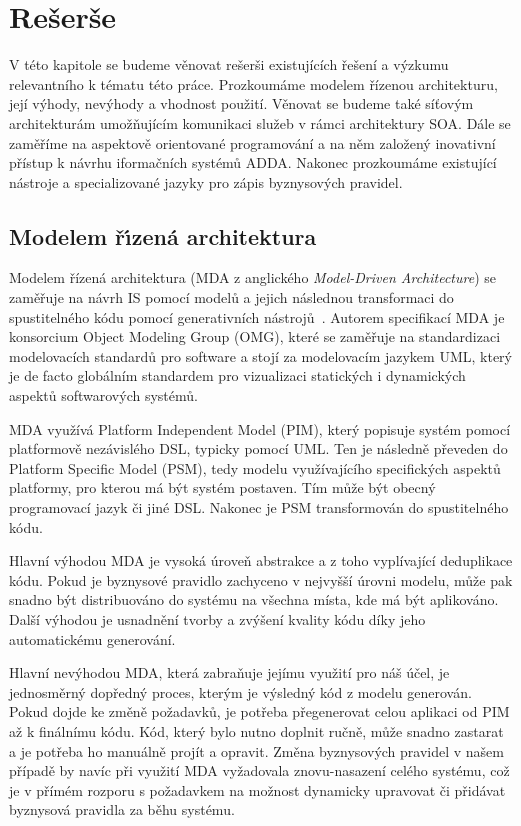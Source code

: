 
\chapter{Rešerše}\label{ch:reserse}

V této kapitole se budeme věnovat rešerši existujících řešení
a výzkumu relevantního k tématu této práce. Prozkoumáme
modelem řízenou architekturu, její výhody, nevýhody a vhodnost
použití. Věnovat se budeme také síťovým architekturám umožňujícím
komunikaci služeb v rámci architektury \gls{SOA}.
Dále se zaměříme na aspektově orientované programování
a na něm založený inovativní přístup k návrhu iformačních systémů \gls{ADDA}.
Nakonec prozkoumáme existující nástroje a specializované jazyky pro zápis
byznysových pravidel.

\section{Modelem ř\'{\i}zená architektura}

Modelem řízená architektura (\gls{MDA} z anglického \textit{Model-Driven
Architecture}) se zaměřuje na návrh \gls{IS} pomocí modelů a jejich
následnou transformaci do spustitelného kódu pomocí generativních nástrojů~\cite{soley2000model}.
Autorem specifikací \gls{MDA} je konsorcium Object Modeling Group (\gls{OMG}),
které se zaměřuje na standardizaci modelovacích standardů pro software
a stojí za modelovacím jazykem \gls{UML}, který je de facto globálním standardem
pro vizualizaci statických i dynamických aspektů softwarových systémů.

\gls{MDA} využívá Platform Independent Model (\gls{PIM}),
který popisuje systém pomocí platformově nezávislého \gls{DSL},
typicky pomocí \gls{UML}. Ten je následně převeden do
Platform Specific Model (\gls{PSM}), tedy modelu využívajícího
specifických aspektů platformy, pro kterou má být systém postaven.
Tím může být obecný programovací jazyk či jiné \gls{DSL}.
Nakonec je \gls{PSM} transformován do spustitelného kódu.

Hlavní výhodou \gls{MDA} je vysoká úroveň abstrakce a z toho vyplívající
deduplikace kódu. Pokud je byznysové pravidlo zachyceno v nejvyšší
úrovni modelu, může pak snadno být distribuováno do systému na všechna
místa, kde má být aplikováno. Další výhodou je usnadnění tvorby a zvýšení
kvality kódu díky jeho automatickému generování.

Hlavní nevýhodou \gls{MDA}, která zabraňuje jejímu využití
pro náš účel, je jednosměrný dopředný proces, kterým je výsledný kód z modelu
generován. Pokud dojde ke změně požadavků, je potřeba přegenerovat
celou aplikaci od \gls{PIM} až k finálnímu kódu. Kód, který bylo
nutno doplnit ručně, může snadno zastarat a je potřeba ho manuálně
projít a opravit. Změna byznysových pravidel v našem případě by
navíc při využití \gls{MDA} vyžadovala znovu-nasazení celého
systému, což je v přímém rozporu s požadavkem na možnost dynamicky
upravovat či přidávat byznysová pravidla za běhu systému.


